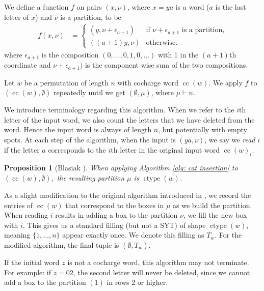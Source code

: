 \documentclass[10pt]{amsart}
\theoremstyle{plain}
\theoremstyle{definition}
\theoremstyle{plain}
\theoremstyle{plain}
\newtheorem{prop}[prop]{Proposition}
\theoremstyle{remark}
\theoremstyle{plain}
\theoremstyle{plain}
\DeclareMathOperator{\ctype}{ctype}
\DeclareMathOperator{\cc}{cc}
\begin{document}
\begin{alg}\label{alg: cat insertion}
We define a function $f$ on pairs $(x,\nu)$, where $x = ya$ is a word ($a$ is the last letter of $x$) and $\nu$ is a partition, to be
\begin{align*}
    f(x,\nu) &= \begin{cases}
        (y,\nu + \epsilon_{a+1}) & \text{if }\nu + \epsilon_{a+1} \text{ is a partition,}\\ 
        ((a+1)y,\nu) & \text{otherwise.}
    \end{cases}
\end{align*}
where $\epsilon_{a+1} $ is the composition $(0,\dots,0, 1,0,\dots)$ with 1 in the $(a+1)$th coordinate and $\nu + \epsilon_{a+1})$ is the component wise sum of the two compositions.
 
Let $w$ be a permutation of length $n$ with cocharge word $\cc(w)$. We apply $f$ to $(\cc(w),\emptyset)$ repeatedly until we get $(\emptyset, \mu)$, where $\mu \vdash n$.
\end{alg}
We introduce terminology regarding this algorithm.
When we refer to the $i$th letter of the input word, we also count the letters that we have deleted from the word. Hence the input word is always of length $n$, but potentially with empty spots.
At each step of the algorithm, when the input is $(ya,\nu)$, we say we \textit{read} $i$ if the letter $a$ corresponds to the $i$th letter in the original input word $\cc(w)_i$.

\begin{prop}[Blasiak {\cite{Blasiak}}]
   When applying Algorithm \ref{alg: cat insertion} to $(\cc(w),\emptyset),$ the resulting partition $\mu $ is $\ctype(w)$.
\end{prop}

As a slight modification to the original algorithm introduced in \cite{Blasiak}, we record the entries of $\cc(w)$ that correspond to the boxes in $\mu$ as we build the partition. When reading $i$ results in adding a box to the partition $\nu$, we fill the new box with $i$. This gives us a standard filling (but not a SYT) of shape $\ctype(w)$, meaning $\{1,\dots, n\}$ appear exactly once. We denote this filling as $T_w$. For the modified algorithm, the final tuple is $(\emptyset, T_w)$.

If the initial word $z$ is not a cocharge word, this algorithm may not terminate. For example: if $z = 02$, the second letter will never be deleted, since we cannot add a box to the partition $(1)$ in rows $2$ or higher.
\end{document}
